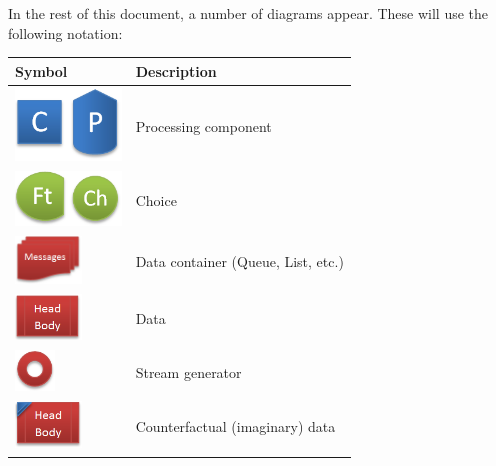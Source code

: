 In the rest of this document, a number of diagrams appear. These will use the following notation:

\begin{center}
	\begin{tabular}{l l}
		\toprule
		Symbol & Description\\
		\midrule
		
		\begin{minipage}[t]{0.2\textwidth}
			\includegraphics[width=80pt]{figs/legend_proc.png}
		\end{minipage}
		 & Processing component\\
		\includegraphics[width=80pt]{figs/legend_choice.png} & Choice\\
		\includegraphics[width=50pt]{figs/legend_container.png} & Data container (Queue, List, etc.)\\
		\includegraphics[width=50pt]{figs/legend_data.png} & Data\\
		\includegraphics[width=30pt]{figs/legend_generator.png} & Stream generator\\
		\includegraphics[width=50pt]{figs/legend_imaginary.png} & Counterfactual (imaginary) data\\
		\bottomrule
	\end{tabular}
\end{center}

